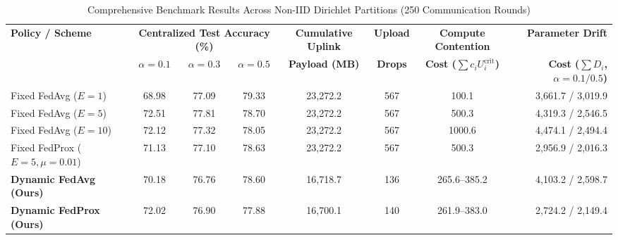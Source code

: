\begin{table}[t]
\caption{Comprehensive Benchmark Results Across Non-IID Dirichlet Partitions (250 Communication Rounds)}
\label{tab:evaluation_results}
\centering
\begin{tabular}{lccccccr}
\toprule
\textbf{Policy / Scheme} & \multicolumn{3}{c}{\textbf{Centralized Test Accuracy (\%)}} & \textbf{Cumulative Uplink} & \textbf{Upload} & \textbf{Compute Contention} & \textbf{Parameter Drift} \\
 & $\alpha = 0.1$ & $\alpha = 0.3$ & $\alpha = 0.5$ & \textbf{Payload (MB)} & \textbf{Drops} & \textbf{Cost ($\sum c_i U_i^{\text{crit}}$)} & \textbf{Cost ($\sum D_i$, $\alpha=0.1 / 0.5$)} \\
\midrule
Fixed FedAvg ($E = 1$) & 68.98 & 77.09 & 79.33 & 23,272.2 & 567 & 100.1 & 3,661.7 / 3,019.9 \\
Fixed FedAvg ($E = 5$) & 72.51 & 77.81 & 78.70 & 23,272.2 & 567 & 500.3 & 4,319.3 / 2,546.5 \\
Fixed FedAvg ($E = 10$) & 72.12 & 77.32 & 78.05 & 23,272.2 & 567 & 1000.6 & 4,474.1 / 2,494.4 \\
Fixed FedProx ($E = 5, \mu = 0.01$) & 71.13 & 77.10 & 78.63 & 23,272.2 & 567 & 500.3 & 2,956.9 / 2,016.3 \\
\textbf{Dynamic FedAvg (Ours)} & 70.18 & 76.76 & 78.60 & 16,718.7 & 136 & 265.6--385.2 & 4,103.2 / 2,598.7 \\
\textbf{Dynamic FedProx (Ours)} & 72.02 & 76.90 & 77.88 & 16,700.1 & 140 & 261.9--383.0 & 2,724.2 / 2,149.4 \\
\bottomrule
\end{tabular}
\end{table}
